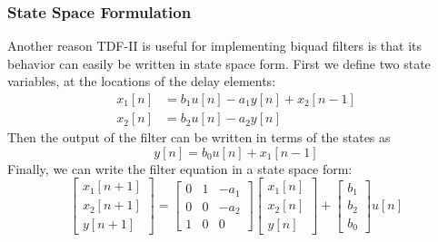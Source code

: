 \documentclass{IEEEtran}
\begin{document}
\subsubsection{State Space Formulation}

Another reason TDF-II is useful for implementing biquad filters
is that its behavior can easily be written in state space form.
First we define two state variables, at the locations of the delay
elements:
%
\begin{equation}
    \begin{split}
        x_1[n] &= b_1 u[n] - a_1 y[n] + x_2[n-1] \\
        x_2[n] &= b_2 u[n] - a_2 y[n]
    \end{split}
    \label{eq:bq_lin_states}
\end{equation}
%
Then the output of the filter can be written in terms of the states
as
%
\begin{equation}
    y[n] = b_0 u[n] + x_1[n-1]
    \label{eq:state_output_lin}
\end{equation}
%
Finally, we can write the filter equation in a state space form:
%
\begin{equation}
    \begin{bmatrix} x_1[n+1] \\ x_2[n+1] \\ y[n+1] \end{bmatrix} =
    \begin{bmatrix} 0& 1& -a_1\\ 0& 0& -a_2\\ 1& 0& 0 \end{bmatrix}
    \begin{bmatrix} x_1[n] \\ x_2[n] \\ y[n] \end{bmatrix}
    + \begin{bmatrix} b_1\\ b_2\\ b_0 \end{bmatrix} u[n]
    \label{eq:bq_lin_state_spaces}
\end{equation}
\end{document}
